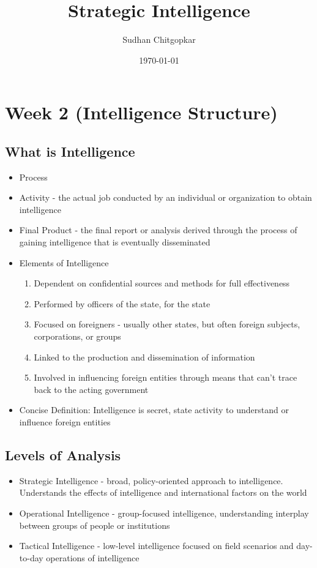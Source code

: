 \documentclass[11pt]{article}
\author{Sudhan Chitgopkar}
\date{\today}
\title{Strategic Intelligence}
\begin{document}
\maketitle
\tableofcontents \clearpage
\section{Week 2 (Intelligence Structure)}
\label{sec:org390bb72}
\subsection{What is Intelligence}
\label{sec:org194fc9b}
\begin{itemize}
\item Process
\item Activity - the actual job conducted by an individual or organization to obtain intelligence
\item Final Product - the final report or analysis derived through the process of gaining intelligence that is eventually disseminated
\item Elements of Intelligence
\begin{enumerate}
\item Dependent on confidential sources and methods for full effectiveness
\item Performed by officers of the state, for the state
\item Focused on foreigners - usually other states, but often foreign subjects, corporations, or groups
\item Linked to the production and dissemination of information
\item Involved in influencing foreign entities through means that can't trace back to the acting government
\end{enumerate}
\item Concise Definition: Intelligence is secret, state activity to understand or influence foreign entities
\end{itemize}
\subsection{Levels of Analysis}
\label{sec:orge11a5ed}
\begin{itemize}
\item Strategic Intelligence - broad, policy-oriented approach to intelligence. Understands the effects of intelligence and international factors on the world
\item Operational Intelligence - group-focused intelligence, understanding interplay between groups of people or institutions
\item Tactical Intelligence - low-level intelligence focused on field scenarios and day-to-day operations of intelligence
\end{itemize}
\end{document}
